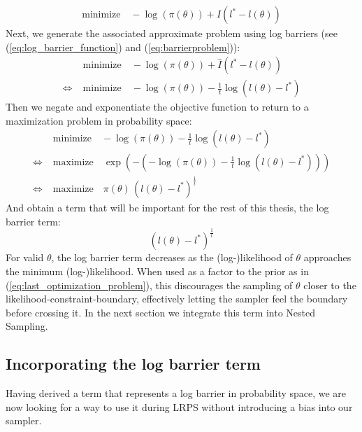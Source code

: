 \documentclass[12pt, a4paper]{report}
\begin{document}
\begin{align}
    \textrm{minimize} \quad -\log(\pi(\theta)) + I(l^* - l(\theta)) \nonumber
\end{align}
Next, we generate the associated approximate problem using log barriers (see (\ref{eq:log_barrier_function}) and (\ref{eq:barrierproblem})):
\begin{align*}
    &\textrm{minimize} \quad -\log(\pi(\theta)) + \hat{I}(l^* - l(\theta)) \\
    \iff \; &\textrm{minimize} \quad -\log(\pi(\theta)) - \frac{1}{t}\log(l(\theta) - l^*)
\end{align*}
Then we negate and exponentiate the objective function to return to a maximization problem in probability space:
\begin{align}
    &\textrm{minimize} \quad -\log(\pi(\theta)) - \frac{1}{t}\log(l(\theta) - l^*) \nonumber\\
    \iff \; &\textrm{maximize} \quad \exp(-(-\log(\pi(\theta)) - \frac{1}{t}\log(l(\theta) - l^*))) \nonumber\\
    \iff \; &\textrm{maximize} \quad \pi(\theta) \, (l(\theta) - l^*)^{\frac{1}{t}} \label{eq:last_optimization_problem}
\end{align}
And obtain a term that will be important for the rest of this thesis, the log barrier term:
\begin{equation}
    (l(\theta) - l^*)^\frac{1}{t} \label{eq:log_barrier_term}
\end{equation}
For valid $\theta$, the log barrier term decreases as the (log-)likelihood of $\theta$ approaches the minimum (log-)likelihood.
When used as a factor to the prior as in (\ref{eq:last_optimization_problem}), this discourages the sampling of $\theta$ closer to the likelihood-constraint-boundary, effectively letting the sampler feel the boundary before crossing it.
In the next section we integrate this term into Nested Sampling.

\subsection{Incorporating the log barrier term}
Having derived a term that represents a log barrier in probability space, we are now looking for a way to use it during LRPS without introducing a bias into our sampler.
\end{document}
